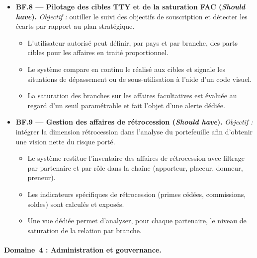 \documentclass[../main.tex]{subfiles}
\begin{document}
\begin{itemize}[leftmargin=1.5cm, itemsep=6pt]

  \item \textbf{BF.8 --- Pilotage des cibles TTY et de la saturation FAC (\textit{Should have}).}
  \emph{Objectif :} outiller le suivi des objectifs de souscription et détecter les écarts par rapport au plan stratégique.
  \begin{itemize}[label=\textendash, itemsep=2pt]
    \item L'utilisateur autorisé peut définir, par pays et par branche, des parts cibles pour les affaires en traité proportionnel.
    \item Le système compare en continu le réalisé aux cibles et signale les situations de dépassement ou de sous-utilisation à l'aide d'un code visuel.
    \item La saturation des branches sur les affaires facultatives est évaluée au regard d'un seuil paramétrable et fait l'objet d'une alerte dédiée.
  \end{itemize}

  \item \textbf{BF.9 --- Gestion des affaires de rétrocession (\textit{Should have}).}
  \emph{Objectif :} intégrer la dimension rétrocession dans l'analyse du portefeuille afin d'obtenir une vision nette du risque porté.
  \begin{itemize}[label=\textendash, itemsep=2pt]
    \item Le système restitue l'inventaire des affaires de rétrocession avec filtrage par partenaire et par rôle dans la chaîne (apporteur, placeur, donneur, preneur).
    \item Les indicateurs spécifiques de rétrocession (primes cédées, commissions, soldes) sont calculés et exposés.
    \item Une vue dédiée permet d'analyser, pour chaque partenaire, le niveau de saturation de la relation par branche.
  \end{itemize}

\end{itemize}

\paragraph{Domaine~4 : Administration et gouvernance.}
\end{document}
